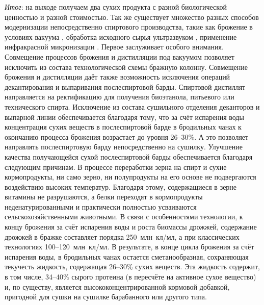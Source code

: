 \textit{Итог}: на выходе получаем два сухих продукта с разной биологической ценностью и разной стоимостью. 
Так же существует множество разных способов модернизации непосредственно спиртового производства, такие как брожение в условиях вакуума \cite{web_npk,Arseniev_2001_4_Journal}, обработка исходного сырья ультразвуком \cite{Smirnova_2006_1_Journal}, применение инфракрасной микронизации \cite{Zverev_2006}. 
Первое заслуживает особого внимания. 
Совмещение процессов брожения и дистилляции под вакуумом позволяет исключить из состава технологической схемы бражную колонну. 
Совмещение брожения и дистилляции даёт также возможность исключения операций декантирования и выпаривания послеспиртовой барды. 
Спиртовой дистиллят направляется на ректификацию для получения биоэтанола, питьевого или технического спирта. 
Исключение из состава сушильного отделения деканторов и выпарной линии обеспечивается благодаря тому, что за счёт испарения воды концентрация сухих веществ в послеспиртовой барде в бродильных чанах к окончанию процесса брожения возрастает до уровня 26--30\%. 
А это позволяет направлять послеспиртовую барду непосредственно на сушилку. 
Улучшение качества получающейся сухой послеспиртовой барды обеспечивается благодаря следующим причинам. 
В процессе переработки зерна на спирт и сухие кормопродукты, ни само зерно, ни полупродукты на его основе не подвергаются воздействию высоких температур. 
Благодаря этому, содержащиеся в зерне витамины не разрушаются, а белки переходят в кормопродукты неденатурированными и практически полностью усваиваются сельскохозяйственными животными. 
В связи с особенностями технологии, к концу брожения за счёт испарения воды и роста биомассы дрожжей, содержание дрожжей в бражке составляет порядка 250~млн~кл/мл, а при классических технологиях 100--120~млн~кл/мл. 
В результате, в конце цикла брожения за счёт испарения воды, в бродильных чанах остается сметанообразная, сохраняющая текучесть жидкость, содержащая 26--30\% сухих веществ. 
Эта жидкость содержит, в том числе, 34--40\% сырого протеина (в пересчёте на активное сухое вещество) и, по существу, является высококонцентрированной кормовой добавкой, пригодной для сушки на сушилке барабанного или другого типа.


